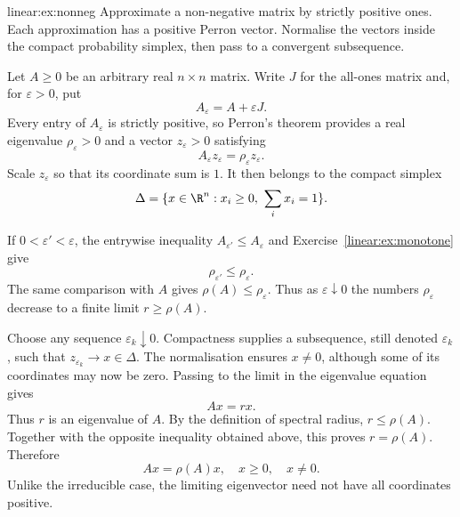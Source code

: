 \begin{solution}{linear:ex:nonneg}
\idea Approximate a non-negative matrix by strictly positive ones. Each approximation has a positive Perron vector. Normalise the vectors inside the compact probability simplex, then pass to a convergent subsequence.

\writeup Let $A\ge0$ be an arbitrary real $n\times n$ matrix. Write $J$ for the all-ones matrix and, for $\varepsilon>0$, put
\[
A_\varepsilon=A+\varepsilon J.
\]
Every entry of $A_\varepsilon$ is strictly positive, so Perron's theorem provides a real eigenvalue $\rho_\varepsilon>0$ and a vector $z_\varepsilon>0$ satisfying
\[
A_\varepsilon z_\varepsilon=\rho_\varepsilon z_\varepsilon.
\]
Scale $z_\varepsilon$ so that its coordinate sum is $1$. It then belongs to the compact simplex
\[
\Delta=\{x\in\R^n:x_i\ge0,\ \sum_i x_i=1\}.
\]

If $0<\varepsilon'<\varepsilon$, the entrywise inequality $A_{\varepsilon'}\le A_\varepsilon$ and Exercise~\ref{linear:ex:monotone} give
\[
\rho_{\varepsilon'}\le\rho_\varepsilon.
\]
The same comparison with $A$ gives $\rho(A)\le\rho_\varepsilon$. Thus as $\varepsilon\downarrow0$ the numbers $\rho_\varepsilon$ decrease to a finite limit $r\ge\rho(A)$.

Choose any sequence $\varepsilon_k\downarrow0$. Compactness supplies a subsequence, still denoted $\varepsilon_k$, such that $z_{\varepsilon_k}\to x\in\Delta$. The normalisation ensures $x\ne0$, although some of its coordinates may now be zero. Passing to the limit in the eigenvalue equation gives
\[
Ax=rx.
\]
Thus $r$ is an eigenvalue of $A$. By the definition of spectral radius, $r\le\rho(A)$. Together with the opposite inequality obtained above, this proves $r=\rho(A)$. Therefore
\[
\boxed{Ax=\rho(A)x,\quad x\ge0,\quad x\ne0}.
\]
Unlike the irreducible case, the limiting eigenvector need not have all coordinates positive.
\end{solution}

